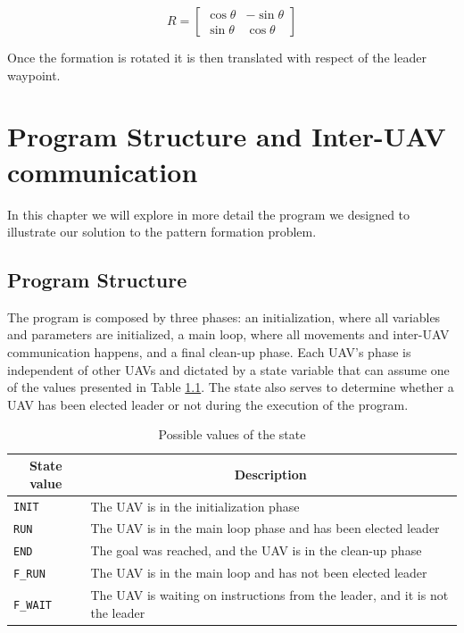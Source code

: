 \begin{equation}
	R = \begin{bmatrix} \cos \theta & -\sin \theta \\ \sin \theta & \cos \theta \end{bmatrix}
	\label{eq:rot-mat}
\end{equation}

Once the formation is rotated it is then translated with respect of the leader waypoint.


\chapter{Program Structure and Inter-UAV communication}

In this chapter we will explore in more detail the program we designed to illustrate our 
solution to the pattern formation problem.

\section{Program Structure}

The program is composed by three phases: an initialization, where all variables and parameters
are initialized, a main loop, where all movements and inter-UAV communication happens, and a 
final clean-up phase. Each UAV's phase is independent of other UAVs and dictated by a state 
variable that can assume one of the values presented in Table \ref{tab:states}. The state 
also serves to determine whether a UAV has been elected leader or not during the execution
of the program. 

\begin{table}
	\caption{Possible values of the state}\label{tab:states}
	\begin{center}
		\begin{tabular}[t]{l|l}
			\hline
			\multicolumn{1}{c|}{\textbf{State value}} & 
			\multicolumn{1}{c}{\textbf{Description}} \\
			\hline 
			\texttt{INIT} & The UAV is in the initialization phase \\
			\hline
			\texttt{RUN} & The UAV is in the main loop phase and has been elected leader \\
			\hline
			\texttt{END} & The goal was reached, and the UAV is in the clean-up phase \\
			\hline
			\texttt{F\_RUN} & The UAV is in the main loop and has not been elected leader \\
			\hline
			\texttt{F\_WAIT} & The UAV is waiting on instructions from the leader, and it is not the leader \\
			\hline
		\end{tabular}
	\end{center}
\end{table}

